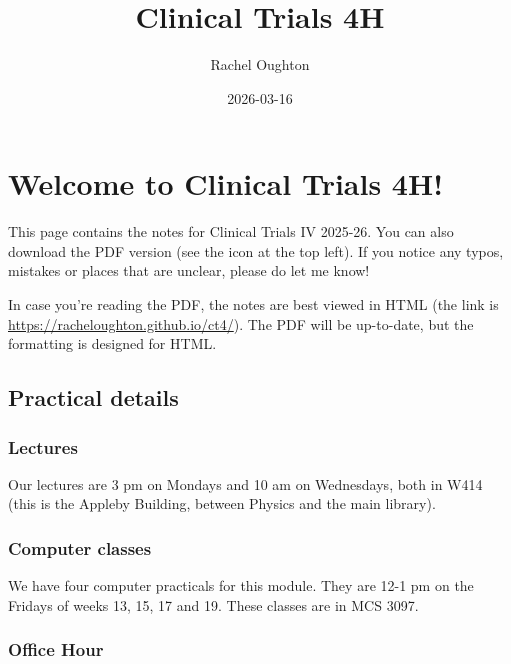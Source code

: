\documentclass[
  openany]{book}
\title{Clinical Trials 4H}
\author{Rachel Oughton}
\date{2026-03-16}
\theoremstyle{definition}
\theoremstyle{definition}
\theoremstyle{definition}
\theoremstyle{definition}
\theoremstyle{remark}
\begin{document}
\maketitle

{
\setcounter{tocdepth}{1}
\tableofcontents
}
\chapter*{Welcome to Clinical Trials 4H!}\label{welcome-to-clinical-trials-4h}

This page contains the notes for Clinical Trials IV 2025-26. You can also download the PDF version (see the icon at the top left). If you notice any typos, mistakes or places that are unclear, please do let me know!

In case you're reading the PDF, the notes are best viewed in HTML (the link is \url{https://racheloughton.github.io/ct4/}). The PDF will be up-to-date, but the formatting is designed for HTML.

\section*{Practical details}\label{practical-details}

\subsection*{Lectures}\label{lectures}

Our lectures are 3 pm on Mondays and 10 am on Wednesdays, both in W414 (this is the Appleby Building, between Physics and the main library).

\subsection*{Computer classes}\label{computer-classes}

We have four computer practicals for this module. They are 12-1 pm on the Fridays of weeks 13, 15, 17 and 19. These classes are in MCS 3097.

\subsection*{Office Hour}\label{office-hour}
\end{document}
